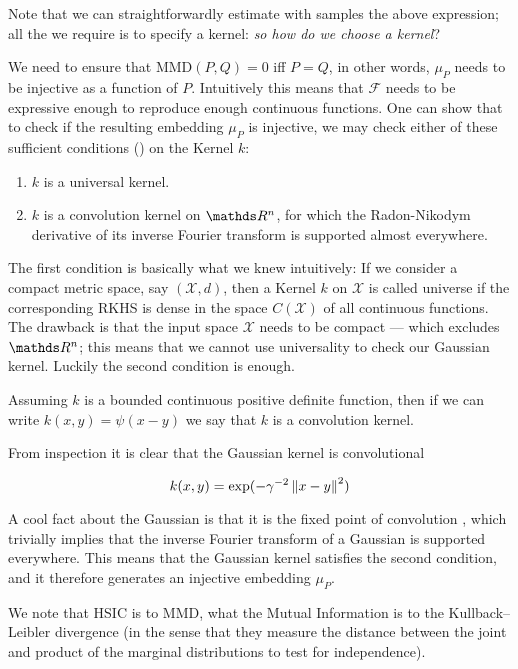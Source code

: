 Note that we can straightforwardly estimate with samples the above expression; all the we require is 
to specify a kernel: \textit{so how do we choose a kernel}?

We need to ensure that $\text{MMD}(P, Q) = 0$ iff $P = Q$, in other words, $\mu_P$ needs to be injective
as a function of $P$. Intuitively this means that $\mathcal{F}$ needs to be expressive enough to 
reproduce enough continuous functions. One can show that to check if the resulting embedding 
$\mu_P$ is injective, we may check either of these sufficient conditions (\cite{sriperumbudur2008injective}) 
on the Kernel $k$:

\begin{enumerate}
    \item $k$ is a universal kernel.
    \item $k$ is a convolution kernel on $\R^n$, for which the Radon-Nikodym derivative of 
    its inverse Fourier transform is supported almost everywhere.
\end{enumerate}

The first condition is basically what we knew intuitively: 
If we consider a compact metric space, say $(\mathcal{X}, d)$, then a Kernel $k$ on $\mathcal{X}$
is called universe if the corresponding RKHS is dense 
in the space $C(\mathcal{X})$ of all continuous functions. The drawback is that the input space $\mathcal{X}$ needs to be compact --- which excludes $\R^n$; 
this means that we cannot use universality to check our Gaussian kernel. Luckily the second condition
is enough.

Assuming $k$ is a bounded continuous positive definite function, then if we can write
$k(x, y) = \psi (x - y)$ we say that $k$ is a convolution kernel.

From inspection it is clear that the Gaussian kernel is convolutional

$$
    k(x, y) = \exp (-\gamma^{-2}\left\lVert x - y\right\rVert^2)
$$

A cool fact about the Gaussian is that it is the fixed point of convolution
, which trivially implies
that the inverse Fourier transform of a Gaussian is supported everywhere. 
 This means that the Gaussian kernel satisfies the second
condition, and it therefore generates an injective embedding $\mu_P$.

We note that HSIC is to MMD, what the Mutual Information is to the Kullback–Leibler divergence (in the 
sense that they measure the distance between the joint and product of the marginal distributions to test for independence).


